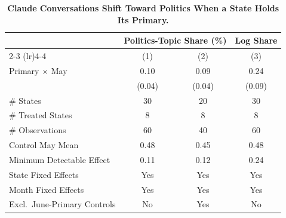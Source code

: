 \begin{table}[t]
\centering
\caption{\textbf{Claude Conversations Shift Toward Politics When a State Holds Its Primary.}\label{tab:aei_did}}
\begin{tabular}{lccc}
\toprule \toprule
 & \multicolumn{2}{c}{Politics-Topic Share (\%)} & Log Share \\
\cmidrule(lr){2-3} \cmidrule(lr){4-4}
 & (1) & (2) & (3) \\
\midrule
Primary $\times$ May & 0.10 & 0.09 & 0.24 \\
 & (0.04) & (0.04) & (0.09) \\[2mm]
\# States & 30 & 20 & 30 \\
\# Treated States & 8 & 8 & 8 \\
\# Observations & 60 & 40 & 60 \\
Control May Mean & 0.48 & 0.45 & 0.48 \\
Minimum Detectable Effect & 0.11 & 0.12 & 0.24 \\
\midrule
State Fixed Effects & Yes & Yes & Yes \\
Month Fixed Effects & Yes & Yes & Yes \\
Excl.\ June-Primary Controls & No & Yes & No \\
\bottomrule \bottomrule
\end{tabular}
\end{table}
